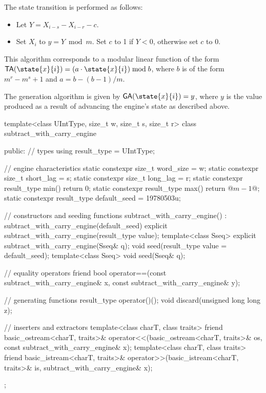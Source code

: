 \pnum
The state transition
is performed as follows:
\begin{itemize}
 \item
   Let $Y = X_{i-s} - X_{i-r} - c$.
 \item
   Set $X_i$ to $y = Y \bmod m$.
   Set $c$ to 1 if $Y < 0$,
   otherwise set $c$ to 0.
\end{itemize}
\begin{note}
 This algorithm corresponds
 to a modular linear function
 of the form
 $\mathsf{TA}(\state{x}{i}) = (a \cdot \state{x}{i}) \bmod b$,
 where $b$ is of the form
 $m^r - m^s + 1$
 and $a = b - (b - 1) / m$.
\end{note}

\pnum
The generation algorithm
is given by $\mathsf{GA}(\state{x}{i}) = y$,
where $y$ is the value produced as a result
of advancing the engine's state as described above.

%
%
\begin{codeblock}
template<class UIntType, size_t w, size_t s, size_t r>
  class subtract_with_carry_engine {
  public:
    // types
    using result_type = UIntType;

    // engine characteristics
    static constexpr size_t word_size = w;
    static constexpr size_t short_lag = s;
    static constexpr size_t long_lag = r;
    static constexpr result_type min() { return 0; }
    static constexpr result_type max() { return @$m - 1$@; }
    static constexpr result_type default_seed = 19780503u;

    // constructors and seeding functions
    subtract_with_carry_engine() : subtract_with_carry_engine(default_seed) {}
    explicit subtract_with_carry_engine(result_type value);
    template<class Sseq> explicit subtract_with_carry_engine(Sseq& q);
    void seed(result_type value = default_seed);
    template<class Sseq> void seed(Sseq& q);

    // equality operators
    friend bool operator==(const subtract_with_carry_engine& x,
                           const subtract_with_carry_engine& y);

    // generating functions
    result_type operator()();
    void discard(unsigned long long z);

    // inserters and extractors
    template<class charT, class traits>
      friend basic_ostream<charT, traits>&
        operator<<(basic_ostream<charT, traits>& os, const subtract_with_carry_engine& x);
    template<class charT, class traits>
      friend basic_istream<charT, traits>&
        operator>>(basic_istream<charT, traits>& is, subtract_with_carry_engine& x);
  };
\end{codeblock}

